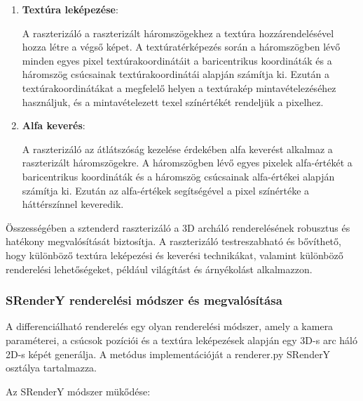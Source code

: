\documentclass[12pt,a4]{article}
\begin{document}
\begin{enumerate}
     \item \textbf{Textúra leképezése}:
     
     A raszterizáló a raszterizált háromszögekhez a textúra hozzárendelésével  hozza létre a végső képet. 
A textúratérképezés során a háromszögben lévő minden egyes pixel textúrakoordinátáit a baricentrikus koordináták és a háromszög csúcsainak textúrakoordinátái alapján számítja ki.
	Ezután a textúrakoordinátákat a megfelelő helyen a textúrakép mintavételezéséhez használjuk, és a mintavételezett texel színértékét rendeljük a pixelhez.
 
     \item \textbf{Alfa keverés}:
     
     A raszterizáló az átlátszóság kezelése érdekében alfa keverést alkalmaz a raszterizált háromszögekre. 
	A háromszögben lévő egyes pixelek alfa-értékét a baricentrikus koordináták és a háromszög csúcsainak alfa-értékei alapján számítja ki. 
	Ezután az alfa-értékek segítségével a pixel színértéke a háttérszínnel keveredik.
 
 \end{enumerate}
 
 Összességében a sztenderd raszterizáló a 3D archáló renderelésének robusztus és hatékony megvalósítását biztosítja.
 A raszterizáló testreszabható és bővíthető, hogy különböző textúra leképezési és keverési technikákat, valamint különböző renderelési lehetőségeket, például világítást és árnyékolást alkalmazzon.

\subsubsection{SRenderY renderelési módszer és megvalósítása}


 A differenciálható renderelés egy olyan renderelési módszer, amely a kamera paraméterei, a csúcsok pozíciói és a textúra leképezések alapján egy 3D-s arc háló 2D-s képét generálja. A metódus implementációját a renderer.py SRenderY osztálya tartalmazza. 

 Az SRenderY módszer mükődése:
\end{document}
